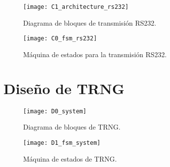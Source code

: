         \begin{figure}[hbtp]
            \caption{Diagrama de bloques de transmisión RS232.}
            \centering
            \texttt{[image: C1\_architecture\_rs232]}
            \label{fig:C1_architecture_rs232}
        \end{figure}

        \begin{figure}[hbtp]
            \caption{Máquina de estados para la transmisión RS232.}
            \centering
            \texttt{[image: C0\_fsm\_rs232]}
            \label{fig:C0_fsm_rs232}
        \end{figure}	

    \section{Diseño de TRNG}

        \begin{figure}[hbtp]
            \caption{Diagrama de bloques de TRNG.}
            \centering
            \texttt{[image: D0\_system]}
            \label{fig:D0_system}
        \end{figure}

        \begin{figure}[hbtp]
            \caption{Máquina de estados de TRNG.}
            \centering
            \texttt{[image: D1\_fsm\_system]}
            \label{fig:D1_fsm_system}
        \end{figure}

